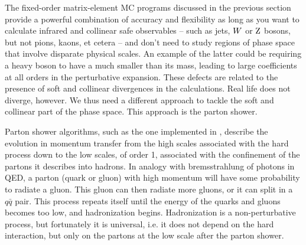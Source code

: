 The fixed-order matrix-element MC programs discussed in the previous section provide a powerful
combination of accuracy and flexibility as long as you want to calculate infrared and collinear safe
observables -- such as jets, $W$ or $\mathrm{Z}$ bosons, but not pions, kaons, et cetera -- and
don’t need to study regions of phase space that involve disparate physical scales. An example of
the latter could be requiring a heavy boson to have a \pt much smaller than its mass, leading to
large coefficients at all orders in the perturbative expansion.
These defects are related to the presence of soft and collinear divergences in the calculations.
Real life does not diverge, however. We thus need a different approach to tackle the soft and
collinear part of the phase space. This approach is the parton shower. 

Parton shower algorithms, such as the one implemented in \PYTHIA, describe the evolution in
momentum transfer from the high scales associated with the hard process down to the low scales, of
order 1\GeV, associated with the confinement of the partons it describes into hadrons. 
In analogy with bremsstrahlung of photons in QED, a parton (quark or gluon) with high momentum will
have some probability to radiate a gluon. This gluon can then radiate more gluons, or it can split
in a $q\bar{q}$ pair. This process repeats itself until the energy of the quarks and gluons becomes
too low, and hadronization begins. Hadronization is a non-perturbative process, but fortunately it
is universal, i.e. it does not depend on the hard interaction, but only on the partons at the low
scale after the parton shower.

